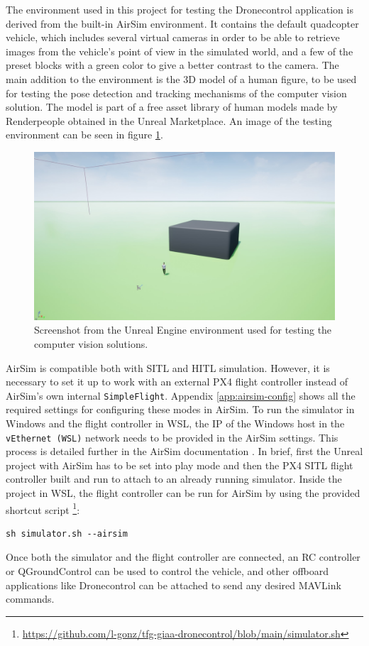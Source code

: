 The environment used in this project for testing the Dronecontrol application is derived from the built-in AirSim environment.
It contains the default quadcopter vehicle, which includes several virtual cameras in order to be able to retrieve images from the vehicle's point of view in the simulated world, and a few of the preset blocks with a green color to give a better contrast to the camera.
The main addition to the environment is the 3D model of a human figure, to be used for testing the pose detection and tracking mechanisms of the computer vision solution.
The model is part of a free asset library of human models made by Renderpeople \cite{render-people} obtained in the Unreal Marketplace.
An image of the testing environment can be seen in figure \ref{fig:unreal-env}.


\begin{figure}
  \centering
  \includegraphics[width=\textwidth,keepaspectratio]{img/unreal-env.jpg}
  \caption{Screenshot from the Unreal Engine environment used for testing the computer vision solutions.}
  \label{fig:unreal-env}
\end{figure}


AirSim is compatible both with SITL and HITL simulation.
However, it is necessary to set it up to work with an external PX4 flight controller instead of AirSim's own internal \texttt{SimpleFlight}.
Appendix \ref{app:airsim-config} shows all the required settings for configuring these modes in AirSim.
To run the simulator in Windows and the flight controller in WSL, the IP of the Windows host in the \texttt{vEthernet (WSL)} network needs to be provided in the AirSim settings.
This process is detailed further in the AirSim documentation \cite{airsim-doc-wsl}.
In brief, first the Unreal project with AirSim has to be set into play mode and then the PX4 SITL flight controller built and run to attach to an already running simulator.
Inside the project in WSL, the flight controller can be run for AirSim by using the provided shortcut script \footnote{\url{https://github.com/l-gonz/tfg-giaa-dronecontrol/blob/main/simulator.sh}}:
\begin{verbatim}
sh simulator.sh --airsim
\end{verbatim}
Once both the simulator and the flight controller are connected, an RC controller or QGroundControl can be used to control the vehicle, and other offboard applications like Dronecontrol can be attached to send any desired MAVLink commands.

